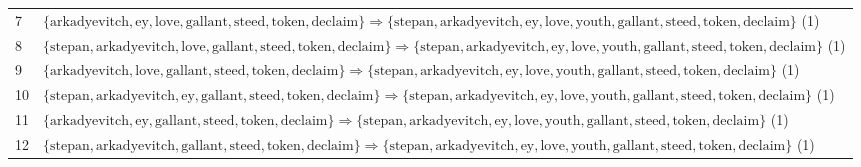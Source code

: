 \begin{appendices}
\begin{longtable}{p{20pt}|p{\dimexpr\textwidth-\tabcolsep-20pt\relax}}
7 & $ \{ \text{arkadyevitch},\allowbreak\text{ey},\allowbreak\text{love},\allowbreak\text{gallant},\allowbreak\text{steed},\allowbreak\text{token},\allowbreak\text{declaim} \} \Rightarrow \{ \text{stepan},\allowbreak\text{arkadyevitch},\allowbreak\text{ey},\allowbreak\text{love},\allowbreak\text{youth},\allowbreak\text{gallant},\allowbreak\text{steed},\allowbreak\text{token},\allowbreak\text{declaim} \} $ (1) \\
8 & $ \{ \text{stepan},\allowbreak\text{arkadyevitch},\allowbreak\text{love},\allowbreak\text{gallant},\allowbreak\text{steed},\allowbreak\text{token},\allowbreak\text{declaim} \} \Rightarrow \{ \text{stepan},\allowbreak\text{arkadyevitch},\allowbreak\text{ey},\allowbreak\text{love},\allowbreak\text{youth},\allowbreak\text{gallant},\allowbreak\text{steed},\allowbreak\text{token},\allowbreak\text{declaim} \} $ (1) \\
9 & $ \{ \text{arkadyevitch},\allowbreak\text{love},\allowbreak\text{gallant},\allowbreak\text{steed},\allowbreak\text{token},\allowbreak\text{declaim} \} \Rightarrow \{ \text{stepan},\allowbreak\text{arkadyevitch},\allowbreak\text{ey},\allowbreak\text{love},\allowbreak\text{youth},\allowbreak\text{gallant},\allowbreak\text{steed},\allowbreak\text{token},\allowbreak\text{declaim} \} $ (1) \\
10 & $ \{ \text{stepan},\allowbreak\text{arkadyevitch},\allowbreak\text{ey},\allowbreak\text{gallant},\allowbreak\text{steed},\allowbreak\text{token},\allowbreak\text{declaim} \} \Rightarrow \{ \text{stepan},\allowbreak\text{arkadyevitch},\allowbreak\text{ey},\allowbreak\text{love},\allowbreak\text{youth},\allowbreak\text{gallant},\allowbreak\text{steed},\allowbreak\text{token},\allowbreak\text{declaim} \} $ (1) \\
11 & $ \{ \text{arkadyevitch},\allowbreak\text{ey},\allowbreak\text{gallant},\allowbreak\text{steed},\allowbreak\text{token},\allowbreak\text{declaim} \} \Rightarrow \{ \text{stepan},\allowbreak\text{arkadyevitch},\allowbreak\text{ey},\allowbreak\text{love},\allowbreak\text{youth},\allowbreak\text{gallant},\allowbreak\text{steed},\allowbreak\text{token},\allowbreak\text{declaim} \} $ (1) \\
12 & $ \{ \text{stepan},\allowbreak\text{arkadyevitch},\allowbreak\text{gallant},\allowbreak\text{steed},\allowbreak\text{token},\allowbreak\text{declaim} \} \Rightarrow \{ \text{stepan},\allowbreak\text{arkadyevitch},\allowbreak\text{ey},\allowbreak\text{love},\allowbreak\text{youth},\allowbreak\text{gallant},\allowbreak\text{steed},\allowbreak\text{token},\allowbreak\text{declaim} \} $ (1) \\

\end{longtable}
\end{appendices}
